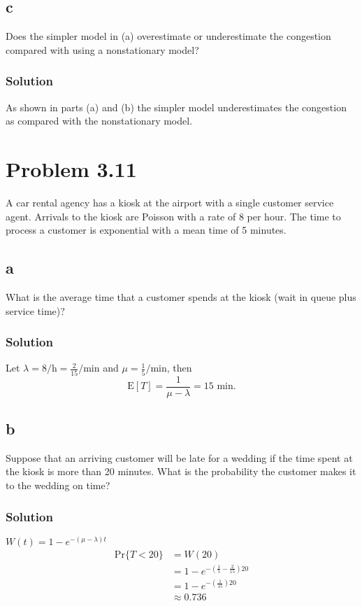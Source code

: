 \documentclass[letterpaper]{amsart}
\begin{document}
\subsection*{c}
Does the simpler model in (a) overestimate or underestimate the congestion compared with using a nonstationary model?
\subsubsection*{Solution}
As shown in parts (a) and (b) the simpler model underestimates the congestion as
compared with the nonstationary model.

\section{Problem 3.11} %
A car rental agency has a kiosk at the airport with a single customer service
agent. Arrivals to the kiosk are Poisson with a rate of 8 per hour. The time
to process a customer is exponential with a mean time of 5 minutes.
\subsection*{a}
What is the average time that a customer spends at the kiosk (wait in
queue plus service time)?
\subsubsection*{Solution}
Let
$\lambda=8/\text{h}=\frac{2}{15}/\text{min}$
and
$\mu=\frac{1}{5}/\text{min}$,
then
\begin{equation*}
\text{E}[T]=\frac{1}{\mu-\lambda}=15\text{ min}.
\end{equation*}
\subsection*{b}
Suppose that an arriving customer will be late for a wedding if the time
spent at the kiosk is more than 20 minutes. What is the probability the
customer makes it to the wedding on time?
\subsubsection*{Solution}
$W(t) = 1-e^{-(\mu-\lambda)t}$
\begin{align*}
  \text{Pr}\{T<20\}&= W(20) \\
  &= 1-e^{-(\frac{1}{5}-\frac{2}{15})20} \\
  &= 1-e^{-(\frac{1}{15})20} \\
  &\approx 0.736
\end{align*}
\end{document}

